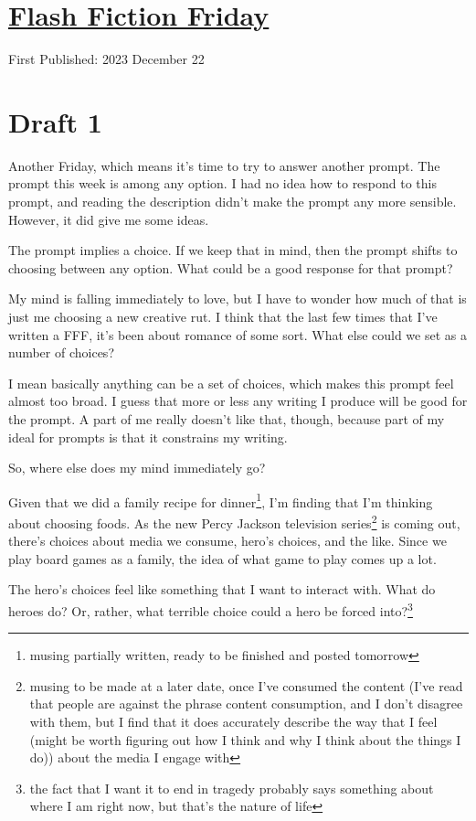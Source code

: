 \documentclass[12pt]{article}[titlepage]
\newcommand{\1}{\={a}}
\newcommand{\2}{\={e}}
\newcommand{\3}{\={\i}}
\newcommand{\4}{\=o}
\newcommand{\5}{\=u}
\newcommand{\6}{\={A}}
\renewcommand{\,}{\textsuperscript{,}}
\begin{document}
\doublespacing
\section{\href{flash-fiction-232.html}{Flash Fiction Friday}}
First Published: 2023 December 22

\section{Draft 1}
Another Friday, which means it's time to try to answer another prompt.
The prompt this week is among any option.
I had no idea how to respond to this prompt, and reading the description didn't make the prompt any more sensible.
However, it did give me some ideas.

The prompt implies a choice.
If we keep that in mind, then the prompt shifts to choosing between any option.
What could be a good response for that prompt?

My mind is falling immediately to love, but I have to wonder how much of that is just me choosing a new creative rut.
I think that the last few times that I've written a FFF, it's been about romance of some sort.
What else could we set as a number of choices?

I mean basically anything can be a set of choices, which makes this prompt feel almost too broad.
I guess that more or less any writing I produce will be good for the prompt.
A part of me really doesn't like that, though, because part of my ideal for prompts is that it constrains my writing.

So, where else does my mind immediately go?

Given that we did a family recipe for dinner\footnote{musing partially written, ready to be finished and posted tomorrow}, I'm finding that I'm thinking about choosing foods.
As the new Percy Jackson television series\footnote{musing to be made at a later date, once I've consumed the content (I've read that people are against the phrase content consumption, and I don't disagree with them, but I find that it does accurately describe the way that I feel (might be worth figuring out how I think and why I think about the things I do)) about the media I engage with} is coming out, there's choices about media we consume, hero's choices, and the like.
Since we play board games as a family, the idea of what game to play comes up a lot.

The hero's choices feel like something that I want to interact with.
What do heroes do?
Or, rather, what terrible choice could a hero be forced into?\footnote{the fact that I want it to end in tragedy probably says something about where I am right now, but that's the nature of life}
\end{document}
